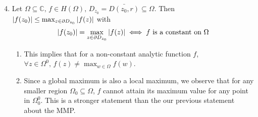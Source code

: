 \documentclass[11pt, oneside]{book}
\begin{document}
\begin{enumerate}
	\setcounter{enumi}{3}
	\item {} Let $\Omega \subseteq \mathbb{C}, \, f \in H(\Omega), \, D_{z_0} = \bar{D(z_0, r)} \subseteq \Omega$. Then $\left|f(z_0)\right| \leq \max_{z \in \partial D_{z_0}} \left|f(z)\right|$ with \label{item:maximum_modulus_principle_strong}
	\begin{equation*}
		\left|f(z_0)\right| = \max_{z \in \partial D_{z_0}} \left|f(z)\right| \iff f \text{ is a constant on } \Omega
	\end{equation*}

	\begin{remark}
		\begin{enumerate}
			\item This implies that for a non-constant analytic function $f$, $\forall z \in \Omega^0, \, f(z) \neq \max_{w \in \Omega} f(w)$.
			\item Since a global maximum is also a local maximum, we observe that for any smaller region $\Omega_0 \subseteq \Omega$, $f$ cannot attain its maximum value for any point in $\Omega_0^0$. This is a stronger statement than the our previous statement about the MMP.
		\end{enumerate}
	\end{remark}


\end{enumerate}
\end{document}
